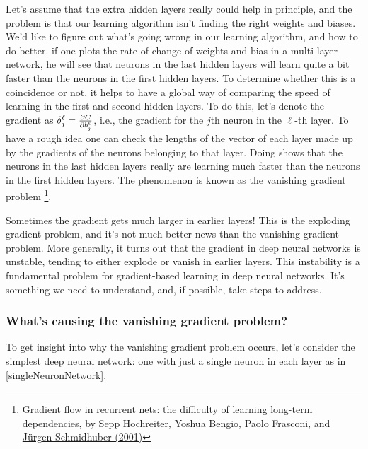 Let's assume that the extra hidden layers really could help in principle, and the problem is that our learning algorithm isn't finding the right weights and biases. We'd like to figure out what's going wrong in our learning algorithm, and how to do better. if one plots the rate of change of weights and bias in a multi-layer network, he will see that neurons in the last hidden layers will learn quite a bit faster than the neurons in the first hidden layers.
To determine whether this is a coincidence or not, it helps to have a global way of comparing the speed of learning in the first and second hidden layers. To do this, let's denote the gradient as $\delta^\ell_j=\frac{\mathrm{\partial} C}{\mathrm{\partial} b^\ell_j}$, i.e., the gradient for the $j$th neuron in the $\ell$-th layer. To have a rough idea one can check the lengths of the vector of each layer made up by the gradients of the neurons belonging to that layer. Doing shows that the neurons in the last hidden layers really are learning much faster than the neurons in the first hidden layers. The phenomenon is known as the vanishing gradient problem \footnote{\href{http://citeseerx.ist.psu.edu/viewdoc/summary?doi=10.1.1.24.7321}{Gradient flow in recurrent nets: the difficulty of learning long-term dependencies, by Sepp Hochreiter, Yoshua Bengio, Paolo Frasconi, and Jürgen Schmidhuber (2001)}}. 

Sometimes the gradient gets much larger in earlier layers! This is the exploding gradient problem, and it's not much better news than the vanishing gradient problem. More generally, it turns out that the gradient in deep neural networks is unstable, tending to either explode or vanish in earlier layers. This instability is a fundamental problem for gradient-based learning in deep neural networks. It's something we need to understand, and, if possible, take steps to address.

\subsubsection{What's causing the vanishing gradient problem?}
To get insight into why the vanishing gradient problem occurs, let's consider the simplest deep neural network: one with just a single neuron in each layer as in \autoref{singleNeuronNetwork}.

